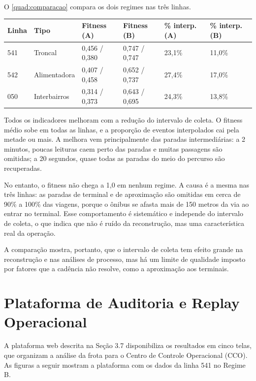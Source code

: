 O \autoref{quad:comparacao} compara os dois regimes nas três linhas.

\begin{tabframed}[htb]
\caption{Comparação entre os regimes de coleta}
\label{quad:comparacao}
\footnotesize
\begin{tabular}{|p{1.2cm}|p{2.6cm}|p{2.4cm}|p{2.4cm}|p{2.2cm}|p{2.2cm}|}
\hline
\textbf{Linha} & \textbf{Tipo} & \textbf{Fitness (A)} & \textbf{Fitness (B)} & \textbf{\% interp. (A)} & \textbf{\% interp. (B)} \\ \hline
541 & Troncal & 0,456 / 0,380 & 0,747 / 0,747 & 23,1\% & 11,0\% \\ \hline
542 & Alimentadora & 0,407 / 0,458 & 0,652 / 0,737 & 27,4\% & 17,0\% \\ \hline
050 & Interbairros & 0,314 / 0,373 & 0,643 / 0,695 & 24,3\% & 13,8\% \\ \hline
\end{tabular}
\fonte{}
\end{tabframed}

Todos os indicadores melhoram com a redução do intervalo de coleta. O fitness médio sobe em todas as linhas, e a proporção de eventos interpolados cai pela metade ou mais. A melhora vem principalmente das paradas intermediárias: a 2 minutos, poucas leituras caem perto das paradas e muitas passagens são omitidas; a 20 segundos, quase todas as paradas do meio do percurso são recuperadas.

No entanto, o fitness não chega a 1,0 em nenhum regime. A causa é a mesma nas três linhas: as paradas de terminal e de aproximação são omitidas em cerca de 90\% a 100\% das viagens, porque o ônibus se afasta mais de 150 metros da via ao entrar no terminal. Esse comportamento é sistemático e independe do intervalo de coleta, o que indica que não é ruído da reconstrução, mas uma característica real da operação.

A comparação mostra, portanto, que o intervalo de coleta tem efeito grande na reconstrução e nas análises de processo, mas há um limite de qualidade imposto por fatores que a cadência não resolve, como a aproximação aos terminais.

\section{Plataforma de Auditoria e Replay Operacional}\label{sec:plataformaAuditoria}

A plataforma web descrita na Seção 3.7 disponibiliza os resultados em cinco telas, que organizam a análise da frota para o Centro de Controle Operacional (CCO). As figuras a seguir mostram a plataforma com os dados da linha 541 no Regime B.

